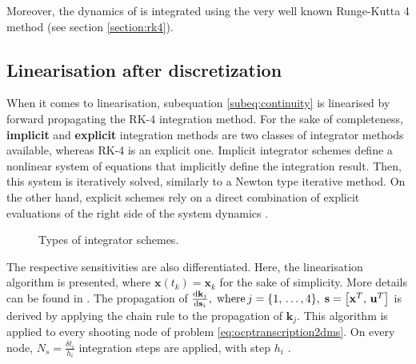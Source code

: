 Moreover, the dynamics of  is integrated using the very well known Runge-Kutta 4 method (see section \ref{section:rk4}).

\subsection{Linearisation after discretization}
\label{subsection:linafterdisc} 

When it comes to linearisation, subequation \eqref{subeq:continuity} is linearised by forward propagating the RK-4 integration method. For the sake of completeness, \textbf{implicit} and \textbf{explicit} integration methods are two classes of integrator methods available, whereas RK-4 is an explicit one. Implicit integrator schemes define a nonlinear system of equations that implicitly define the integration result. Then, this system is iteratively solved, similarly to a Newton type iterative method. On the other hand, explicit schemes rely on a direct combination of explicit evaluations of the right side of the system dynamics \cite{verschueren2022acados}.

\begin{figure}[h]
\centering
{}
\caption{Types of integrator schemes.}
\label{fig:integratormethods}
\end{figure}

The respective sensitivities are also differentiated. Here, the linearisation algorithm  is presented, where $\mathbf{x}(t_k) = \mathbf{x}_k$ for the sake of simplicity. More details can be found in \cite{gros2020linear}. The propagation of $\odv{\mathbf{k}_j}{\mathbf{s}_i},\; \text{where} \, j = \{1,\,\ldots,4\},\; \mathbf{s}=\left[\mathbf{x}^T,\,\mathbf{u}^T\right]$ is derived by applying the chain rule to the propagation of $\mathbf{k}_j$. This algorithm is applied to every shooting node of problem \eqref{eq:ocptranscription2dms}. On every node, $N_s = \frac{\delta t_i}{h_i}$ integration steps are applied, with step $h_i$ \cite{gros2020linear}.

